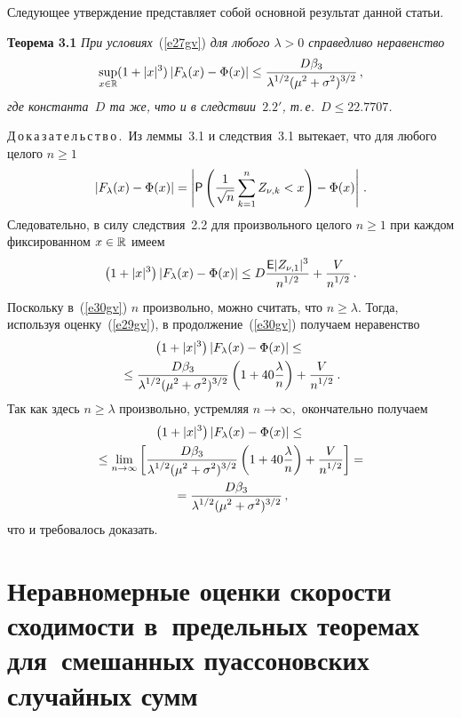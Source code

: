 \begin{multicols}{2}
\medskip

Следующее утверждение представляет собой основной результат данной
статьи.

\medskip

\noindent
\textbf{Теорема 3.1} \textit{При условиях}~(\ref{e27gv}) \textit{для любого $\lambda>0$
справедливо неравенство}
$$
\sup_{x\in\mathbb R}(1+|x|^{3})\left|F_\lambda(x) - \Phi(x)\right|\leq
\displaystyle\frac{\displaystyle D\beta_{3}\mathstrut}{\displaystyle \lambda^{1/2}(\mu^2+\sigma^2)^{3/2}\mathstrut}\,,
$$
\textit{где константа~$D$ та же, что и в следствии~$2.2'$,
т.\,е.\ $D\le22.7707$.}

\medskip

\noindent
Д\,о\,к\,а\,з\,а\,т\,е\,л\,ь\,с\,т\,в\,о\,.\ Из леммы~3.1 и следствия~3.1
вытекает, что для любого целого $n\geq1$
$$
|F_\lambda(x) - \Phi(x)| = \left|{\sf
P}\left(\displaystyle\frac{\displaystyle 1\mathstrut}{\displaystyle \sqrt{n}\mathstrut}\sum_{k=1}^n
Z_{\nu,k}<x\right)-\Phi(x)\right|\,.
$$
Следовательно, в силу следствия~2.2 для произвольного целого
$n\geq1$ при каждом фиксированном $x\in\mathbb R$ имеем
\begin{equation}
\left(1+|x|^{3}\right)\left|F_\lambda(x) - \Phi(x)\right| \leq D\displaystyle\frac{\displaystyle {\sf
E}|Z_{\nu,1}|^{3}\mathstrut}{\displaystyle n^{1/2}\mathstrut}+\displaystyle\frac{\displaystyle V\mathstrut}{\displaystyle n^{1/2}\mathstrut}\,. \label{e30gv}
\end{equation}
Поскольку в~(\ref{e30gv}) $n$ произвольно, можно считать, что
$n\geq\lambda.$ Тогда, используя оценку~(\ref{e29gv}), в продолжение~(\ref{e30gv})
получаем неравенство
\begin{multline*}
\left(1+|x|^{3}\right)\left|F_\lambda(x) - \Phi(x)\right|\leq{}\\
{}\leq
\displaystyle\frac{\displaystyle D\beta_{3}\mathstrut}{\displaystyle \lambda^{1/2}(\mu^2+\sigma^2)^{3/2}\mathstrut}
\left(1+40\displaystyle\frac{\displaystyle \lambda\mathstrut}{\displaystyle n\mathstrut}\right)+\displaystyle\frac{\displaystyle V\mathstrut}{\displaystyle n^{1/2}\mathstrut}\,.
\end{multline*}
Так как здесь $n\geq\lambda$ произвольно, устремляя
$n\rightarrow\infty,$ окончательно получаем
\begin{multline*}
\left(1+|x|^{3}\right)\left|F_\lambda(x) - \Phi(x)\right|\leq{}\\
{}\leq
\lim_{n\rightarrow\infty}\left[\displaystyle\frac{\displaystyle D\beta_{3}\mathstrut}{\displaystyle \lambda^{1/2}(\mu^2+\sigma^2)^{3/2}\mathstrut}
\left(1+40\displaystyle\frac{\displaystyle \lambda\mathstrut}{\displaystyle n\mathstrut}\right)+\displaystyle\frac{\displaystyle V\mathstrut}{\displaystyle n^{1/2}\mathstrut}\right]={}\\
{}=
\displaystyle\frac{\displaystyle D\beta_{3}\mathstrut}{\displaystyle \lambda^{1/2}(\mu^2+\sigma^2)^{3/2}\mathstrut}\,,
\end{multline*}
что и требовалось доказать.

\section{Неравномерные оценки скорости сходимости в~предельных
теоремах для~смешанных пуассоновских случайных сумм}


\end{multicols}
